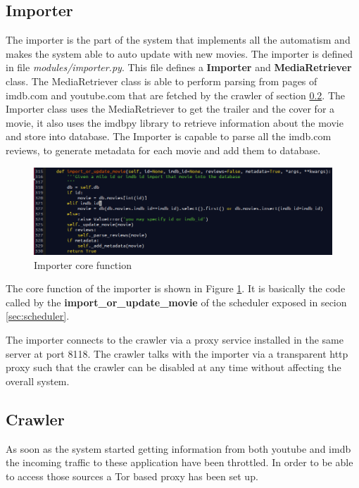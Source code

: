 \subsection{Importer}
\label{sec:importer}

The importer is the part of the system that implements all the automatism and makes the system able to auto update with new movies. The importer is defined in file \textit{modules/importer.py}. This file defines a \textbf{Importer} and \textbf{MediaRetriever} class. The MediaRetriever class is able to perform parsing from pages of imdb.com and youtube.com that are fetched by the crawler of section \ref{sec:crawler}. The Importer class uses the MediaRetriever to get the trailer and the cover for a movie, it also uses the imdbpy \cite{imdbpy} library to retrieve information about the movie and store into database. The Importer is capable to parse all the imdb.com reviews, to generate metadata for each movie and add them to database.

\begin{figure}
  \centering
  \includegraphics[width=\textwidth]{figures/importer_core_function.png}
  \caption{Importer core function}
  \label{fig:importer_core}
\end{figure}

The core function of the importer is shown in Figure \ref{fig:importer_core}. It is basically the code called by the \textbf{import\_or\_update\_movie} of the scheduler exposed in secion \ref{sec:scheduler}.

The importer connects to the crawler via a proxy service installed in the same server at port 8118. The crawler talks with the importer via a transparent \ac{http} proxy such that the crawler can be disabled at any time without affecting the overall system.

\subsection{Crawler}
\label{sec:crawler}

As soon as the system started getting information from both youtube and imdb the incoming traffic to these application have been throttled. In order to be able to access those sources a Tor based proxy has been set up.

